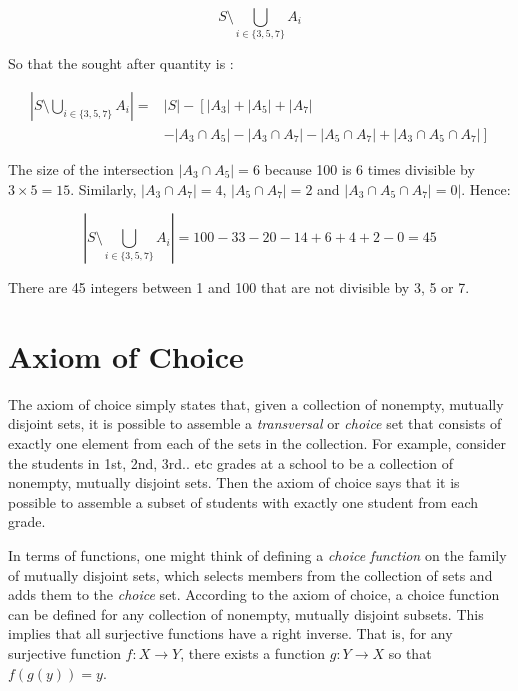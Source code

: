 \begin{equation}
S \setminus \bigcup_{i\in\{3,5,7\}} A_i
\end{equation}

So that the sought after quantity is :

\begin{equation}
\begin{array}{rl}
\left|S \setminus \bigcup_{i\in\{3,5,7\}} A_i\right| =& |S| - \left[ |A_3| + |A_5| + |A_7| \right.\\
& \left. - |A_3 \cap A_5| - |A_3 \cap A_7| - |A_5\cap A_7| + |A_3\cap A_5\cap A_7|\right]
\end{array}
\end{equation}

The size of the intersection $|A_3\cap A_5| = 6$ because 100 is 6 times divisible by $3\times 5 = 15$. Similarly, $|A_3 \cap A_7| =  4$, $|A_5 \cap A_7| =  2$ and $|A_3\cap A_5 \cap A_7| =  0|$. Hence:

\begin{equation}
\left|S \setminus \bigcup_{i\in\{3,5,7\}} A_i\right| = 100 - 33 - 20 - 14 + 6 + 4 + 2 - 0 = 45
\end{equation}

There are 45 integers between 1 and 100 that are not divisible by 3, 5 or 7.


\section{Axiom of Choice}
\label{sec:axiomofchoice}
The axiom of choice simply states that, given a collection of nonempty, mutually disjoint sets, it is possible to assemble a \textit{transversal} or \textit{choice} set that consists of exactly one element from each of the sets in the collection. For example, consider the students in 1st, 2nd, 3rd.. etc grades at a school to be a collection of nonempty, mutually disjoint sets. Then the axiom of choice says that it is possible to assemble a subset of students with exactly one student from each grade. 


In terms of functions, one might think of defining a \textit{choice function} on the family of mutually disjoint sets, which selects members from the collection of sets and adds them to the \textit{choice} set. According to the axiom of choice, a choice function can be defined for any collection of nonempty, mutually disjoint subsets. This implies that all surjective functions have a right inverse. That is, for any surjective function $f:X\rightarrow Y$, there exists a function $g:Y\rightarrow X$ so that $f(g(y)) = y$.   

